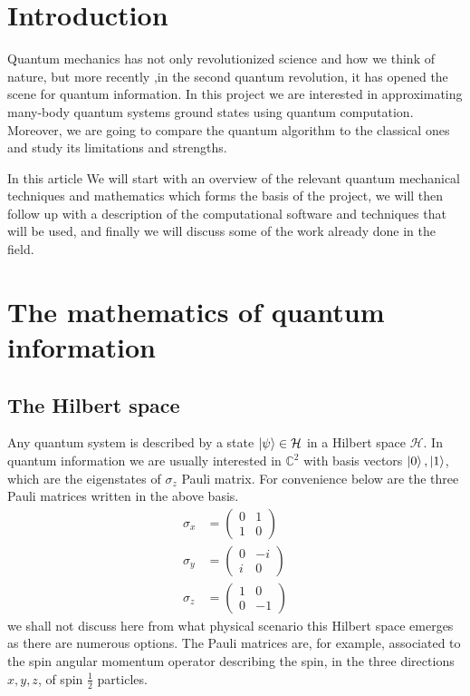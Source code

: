 \documentclass{physics_article}
\date{}
\begin{document}
	\maketitle
	\tableofcontents

	\section{Introduction \label{intro}}
	Quantum mechanics has not only revolutionized science and how we think of nature, but more recently ,in the second quantum revolution, it has opened the scene for quantum information. In this project we are interested in approximating many-body quantum systems ground states using quantum computation. Moreover, we are going to compare the quantum algorithm to the classical ones and study its limitations and strengths. 

	In this article We will start with an overview of the relevant quantum mechanical techniques and mathematics which forms the basis of the project, we will then follow up with a description of the computational software and techniques that will be used, and finally we will discuss some of the work already done in the field.

	\section{The mathematics of quantum information}
	\subsection{The Hilbert space}
	Any quantum system is described by a state $\ket{\psi} \in \mathcal{H}$ in a Hilbert space $\mathcal{H}$. In quantum information we are usually interested in $\mathbb{C}^2$ with basis vectors ${\ket{0},\ket{1}}$, which are the eigenstates of $\sigma_z$ Pauli matrix. For convenience below are the three Pauli matrices written in the above basis.
	\begin{align}
	\sigma_x &= \begin{pmatrix}
	 	0&1\\
	 	1&0
	 \end{pmatrix}\\
	 \sigma_y &= \begin{pmatrix}
	 	0&-i\\
	 	i&0
	 \end{pmatrix}\\
	 \sigma_z &= \begin{pmatrix}
	 	1&0\\
	 	0&-1
	 \end{pmatrix}
 	\end{align}
 	we shall not discuss here from what physical scenario this Hilbert space emerges as there are numerous options. The Pauli matrices are, for example, associated to the spin angular momentum operator describing the spin, in the three directions $x,y,z$, of spin $\frac{1}{2}$ particles\cite{nielsen_chuang_2021}.
\end{document}
